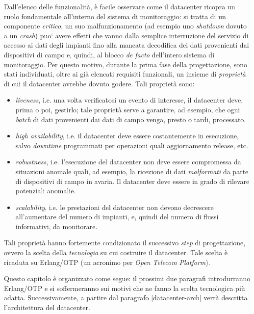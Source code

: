 %
Dall'elenco delle funzionalit\`a, \`e facile osservare come il
datacenter ricopra un ruolo fondamentale all'interno del sistema di monitoraggio: 
si tratta di un componente \emph{critico}, un suo malfunzionamento 
(ad esempio uno \emph{shutdown} dovuto a un \emph{crash}) puo` avere effetti che 
vanno dalla semplice interruzione del servizio di accesso ai dati degli impianti 
fino alla mancata decodifica dei dati provenienti dai dispositivi di campo e, 
quindi, al blocco \emph{de facto} dell'intero sistema di monitoraggio.
%
Per questo motivo, durante la prima fase della progettazione, sono stati 
individuati, oltre ai gi\`a elencati requisiti funzionali, un insieme di 
\emph{propriet\`a} di cui il datacenter avrebbe dovuto godere. Tali propriet\`a 
sono:
%
\begin{itemize}
\item \emph{liveness}, i.e. una volta verificatosi un evento di interesse, 
il datacenter deve, prima o poi, gestirlo; tale propriet\`a serve a garantire, ad 
esempio, che ogni \emph{batch} di dati provenienti dai dati di campo venga, 
presto o tardi, processato.
%
\item \emph{high availability}, i.e. il datacenter deve essere costantemente 
in esecuzione, salvo \emph{downtime} programmati per operazioni quali 
aggiornamento release, etc.
%
\item \emph{robustness}, i.e. l'esecuzione del datacenter non deve essere 
compromessa da situazioni anomale quali, ad esempio, la ricezione di dati 
\emph{malformati} da parte di dispositivi di campo in avaria. Il datacenter 
deve essere in grado di rilevare potenziali anomalie.%
%
\item \emph{scalability}, i.e. le prestazioni del datacenter non devono 
decrescere all'aumentare del numero di impianti, e, quindi del numero di 
flussi informativi, da monitorare. %
%
\end{itemize}
%

%
Tali propriet\`a hanno fortemente condizionato il successivo \emph{step} di
progettazione, ovvero la scelta della \emph{tecnologia} su cui costruire il 
datacenter.
%
Tale scelta \`e ricaduta su Erlang/OTP (un acronimo per \emph{Open Telecom 
Platform}).
%

%
Questo capitolo \`e organizzato come segue: il prossimi due paragrafi
introdurranno Erlang/OTP e si soffermeranno sui motivi che ne fanno la scelta 
tecnologica pi\`u adatta. Successivamente, a partire dal paragrafo \ref{datacenter-arch} 
verr\`a descritta l'architettura del datacenter.
%


